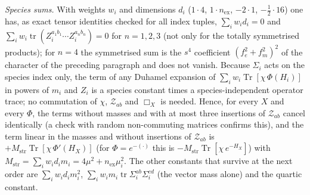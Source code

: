 \emph{Species sums.} With weights \(w_i\) and dimensions \(d_i\) (\(1\cdot4\), \(1\cdot n_{\mathrm{ex}}\), \(-2\cdot1\), \(-\tfrac12\cdot16\)) one has, as exact tensor identities checked for all index tuples, \(\sum_iw_id_i=0\) and \(\sum_iw_i\operatorname{tr}(Z_i^{a_1b_1}\cdots Z_i^{a_nb_n})=0\) for \(n=1,2,3\) (not only for the totally symmetrised products); for \(n=4\) the symmetrised sum is the \(s^4\) coefficient \((f_e^2+f_m^2)^2\) of the character of the preceding paragraph and does not vanish. Because \(\Sigma_i\) acts on the species index only, the term of any Duhamel expansion of \(\sum_iw_i\operatorname{Tr}[\chi\,\Phi(H_i)]\) in powers of \(m_i\) and \(Z_i\) is a species constant times a species-independent operator trace; no commutation of \(\chi\), \(\mathcal Z_{ab}\) and \(\Box_X\) is needed. Hence, for every \(X\) and every \(\Phi\), the terms without masses and with at most three insertions of \(\mathcal Z_{ab}\) cancel identically (a check with random non-commuting matrices confirms this), and the term linear in the masses and without insertions of \(\mathcal Z_{ab}\) is \(+M_{\mathrm{str}}\operatorname{Tr}[\chi\,\Phi'(H_X)]\) (for \(\Phi=e^{-(\cdot)}\) this is \(-M_{\mathrm{str}}\operatorname{Tr}[\chi\,e^{-H_X}]\)) with \(M_{\mathrm{str}}=\sum_iw_id_im_i=4\mu^2+n_{\mathrm{ex}}\mu_i^2\). The other constants that survive at the next order are \(\sum_iw_id_im_i^2\), \(\sum_iw_im_i\operatorname{tr}\Sigma_i^{ab}\Sigma_i^{cd}\) (the vector mass alone) and the quartic constant.



